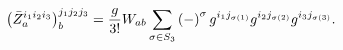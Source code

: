 \begin{equation}
\left( \bar{Z}_{a}^{i_{1}i_{2}i_{3}}\right) _{b}^{j_{1}j_{2}j_{3}}=\frac{g}{%
3!}W_{ab}\sum\limits_{\sigma \in S_{3}}\left( -\right) ^{\sigma
}g^{i_{1}j_{\sigma (1)}}g^{i_{2}j_{\sigma (2)}}g^{i_{3}j_{\sigma (3)}}.
\label{i22}
\end{equation}

